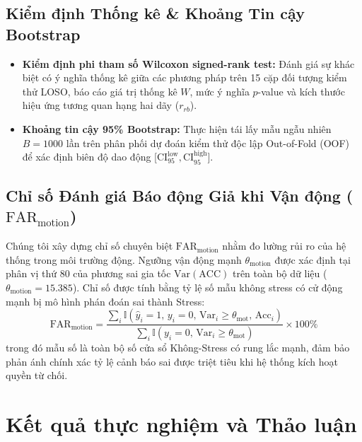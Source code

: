 \documentclass[conference]{IEEEtran}
\begin{document}
\subsection{Kiểm định Thống kê \& Khoảng Tin cậy Bootstrap}
\begin{itemize}
    \item \textbf{Kiểm định phi tham số Wilcoxon signed-rank test:} Đánh giá sự khác biệt có ý nghĩa thống kê giữa các phương pháp trên 15 cặp đối tượng kiểm thử LOSO, báo cáo giá trị thống kê $W$, mức ý nghĩa $p$-value và kích thước hiệu ứng tương quan hạng hai dãy ($r_{rb}$).
    \item \textbf{Khoảng tin cậy 95\% Bootstrap:} Thực hiện tái lấy mẫu ngẫu nhiên $B = 1000$ lần trên phân phối dự đoán kiểm thử độc lập Out-of-Fold (OOF) để xác định biên độ dao động [$\text{CI}_{95}^{\text{low}}, \text{CI}_{95}^{\text{high}}$].
\end{itemize}

\subsection{Chỉ số Đánh giá Báo động Giả khi Vận động \texorpdfstring{($\text{FAR}_{\text{motion}}$)}{(FAR-motion)}}
Chúng tôi xây dựng chỉ số chuyên biệt $\text{FAR}_{\text{motion}}$ nhằm đo lường rủi ro của hệ thống trong môi trường động. Ngưỡng vận động mạnh $\theta_{\text{motion}}$ được xác định tại phân vị thứ 80 của phương sai gia tốc $\text{Var}(\text{ACC})$ trên toàn bộ dữ liệu ($\theta_{\text{motion}} = 15.385$). Chỉ số được tính bằng tỷ lệ số mẫu không stress có cử động mạnh bị mô hình phán đoán sai thành Stress:
\begin{equation}
\text{FAR}_{\text{motion}} = \frac{\sum_{i} \mathbb{I}(\hat{y}_i = 1,\, y_i = 0,\, \text{Var}_i \ge \theta_{\text{mot}},\, \text{Acc}_i)}{\sum_{i} \mathbb{I}(y_i = 0,\, \text{Var}_i \ge \theta_{\text{mot}})} \times 100\%
\end{equation}
trong đó mẫu số là toàn bộ số cửa sổ Không-Stress có rung lắc mạnh, đảm bảo phản ánh chính xác tỷ lệ cảnh báo sai được triệt tiêu khi hệ thống kích hoạt quyền từ chối.

\section{Kết quả thực nghiệm và Thảo luận}
\end{document}

